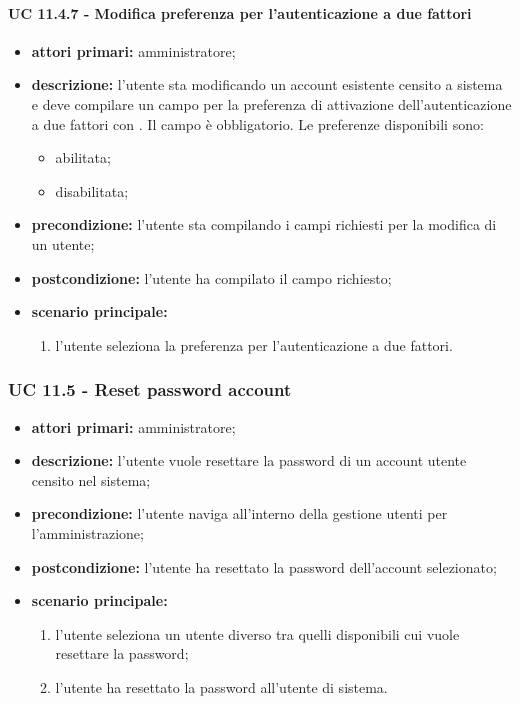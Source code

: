 				\paragraph{UC 11.4.7 - Modifica preferenza per l'autenticazione a due fattori}
				\begin{itemize}
					\item \textbf{attori primari:} amministratore;
					\item \textbf{descrizione:} l'utente sta modificando un account esistente censito a sistema e deve compilare un campo per la preferenza di attivazione dell'autenticazione a due fattori con . Il campo è obbligatorio. Le preferenze disponibili sono:
					\begin{itemize}
						\item abilitata;
						\item disabilitata;
					\end{itemize}
					\item \textbf{precondizione:} l'utente sta compilando i campi richiesti per la modifica di un utente;
					\item \textbf{postcondizione:} l'utente ha compilato il campo richiesto;
					\item \textbf{scenario principale:}
					\begin{enumerate}
						\item{l'utente seleziona la preferenza per l'autenticazione a due fattori.}
					\end{enumerate}
				\end{itemize}



			\subsubsection{UC 11.5 - Reset password account}
			\begin{itemize}
				\item \textbf{attori primari:} amministratore;
				\item \textbf{descrizione:} l'utente vuole resettare la password di un account utente censito nel sistema;
				\item \textbf{precondizione:} l'utente naviga all'interno della gestione utenti per l'amministrazione;
				\item \textbf{postcondizione:} l'utente ha resettato la password dell'account selezionato;
				\item \textbf{scenario principale:}
				\begin{enumerate}
					\item{l'utente seleziona un utente diverso tra quelli disponibili cui vuole resettare la password;}
					\item{l'utente ha resettato la password all'utente di sistema.}
				\end{enumerate}
			\end{itemize}


